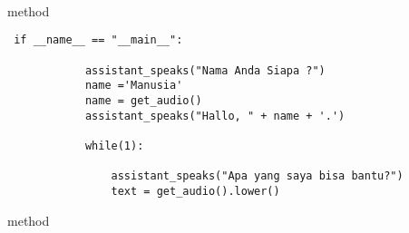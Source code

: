 \\
\\
\\
\\
\\
\\
\\
\\
\\
\\
\\
\\
\\
\\
\\
\\
\\
\\
\\
\\
\\
\\
\\
\\
\\
\\
\\
\\
\\
\\
\\
\\
\\
\\
\\
 method 
\begin{lstlisting}
 if __name__ == "__main__": 
        
            assistant_speaks("Nama Anda Siapa ?") 
            name ='Manusia'
            name = get_audio() 
            assistant_speaks("Hallo, " + name + '.') 
            
            while(1): 

                assistant_speaks("Apa yang saya bisa bantu?") 
                text = get_audio().lower() 

\end{lstlisting}
method
\\
\\
\\
\\
\\
\\
\\
\\
\\
\\
\\
